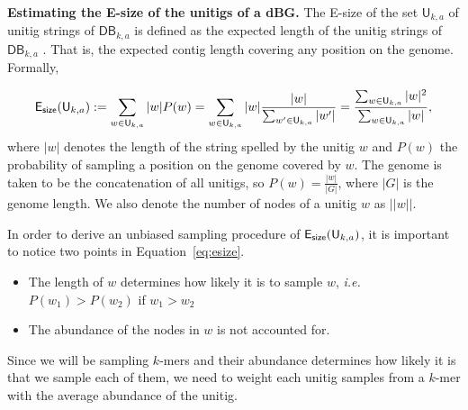 \documentclass[a4paper,11pt]{article}
\newcommand{\kristoffer}[1]{{\color{red}{#1}}}
\newcommand{\alex}[1]{{\color{blue}{#1}}}
\newcommand{\DB}{\mathsf{DB}_{k,a}}
\newcommand{\U}{\mathsf{U}_{k,a}}
\newcommand{\esize}{{\sf E_{size}}}
\begin{document}


\medskip
\noindent\textbf{Estimating the E-size of the unitigs of a dBG.} The E-size of the set $\U$ of unitig strings of $\DB$ is defined as the expected length of the unitig strings of $\DB$ \cite{Salzberg2011}. That is, the expected contig length covering any position on the genome. Formally, 

\begin{equation}
\label{eq:esize}
\esize(\U) := \sum_{w \in \U}|w|P(w) = \sum_{w \in \U} |w|\frac{|w|}{\sum_{w' \in \U}|w'|} = \frac{\sum_{w \in \U}|w|^2}{\sum_{w \in \U}|w|},	
\end{equation}
where $|w|$ denotes the length of the string spelled by the unitig $w$ and $P(w)$ the probability of sampling a position on the genome covered by $w$. The genome is taken to be the concatenation of all unitigs, so $P(w)=\frac{|w|}{|G|}$, where $|G|$ is the genome length. We also denote the number of nodes of a unitig $w$ as $||w||$.

In order to derive an unbiased sampling procedure of $\esize(\U)$, it is important to notice two points in Equation~\ref{eq:esize}.
\begin{itemize}
	\item The length of $w$ determines how likely it is to sample $w$, \emph{i.e.} $P(w_1)>P(w_2)$ if $w_1>w_2$
	\item The abundance of the nodes in $w$ is not accounted for. 
\end{itemize}
Since we will be sampling $k$-mers and their abundance determines how likely it is that we sample each of them, we need to weight each unitig samples from a $k$-mer with the average abundance of the unitig.

\end{document}
